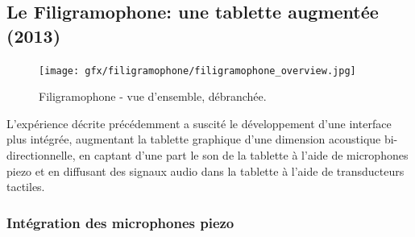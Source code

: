 \subsection{Le Filigramophone: une tablette augmentée (2013)}
\label{sec:interfaces:phylogenese:filigramophone}

\begin{figure}[!htbp]
	\texttt{[image: gfx/filigramophone/filigramophone\_overview.jpg]}
	\caption[Filigramophone - vue d'ensemble, débranchée]{Filigramophone - vue d'ensemble, débranchée.}
	\label{fig:interface:filigramophone}
\end{figure}
\noindent L'expérience décrite précédemment a suscité le développement d'une interface plus intégrée, augmentant la tablette graphique d'une dimension acoustique bi-directionnelle, en captant d'une part le son de la tablette à l'aide de microphones piezo et en diffusant des signaux audio dans la tablette à l'aide de transducteurs tactiles.

\subsubsection{Intégration des microphones piezo}

